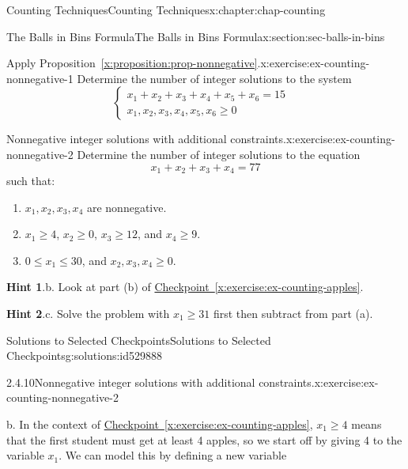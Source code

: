 \documentclass[oneside,10pt,]{book}
\newcommand{\blocktitlefont}{\relax}
\newcommand{\xreffont}{\relax}
\numberwithin{equation}{section}
\newcommand{\amp}{&}
\begin{document}
\begin{chapterptx}{Counting Techniques}{}{Counting Techniques}{}{}{x:chapter:chap-counting}
\begin{sectionptx}{The Balls in Bins Formula}{}{The Balls in Bins Formula}{}{}{x:section:sec-balls-in-bins}
\begin{inlineexercise}{Apply Proposition~{\xreffont\ref*{x:proposition:prop-nonnegative}}.}{x:exercise:ex-counting-nonnegative-1}%
Determine the number of integer solutions to the system%
\begin{equation*}
\begin{cases}
x_1 + x_2 + x_3 + x_4 + x_5 + x_6 = 15 \amp \\ x_1, x_2, x_3, x_4, x_5, x_6 \geq 0 \amp
\end{cases}
\end{equation*}
%
\end{inlineexercise}%
\begin{inlineexercise}{Nonnegative integer solutions with additional constraints.}{x:exercise:ex-counting-nonnegative-2}%
Determine the number of integer solutions to the equation%
\begin{equation*}
x_1 + x_2 + x_3 + x_4 = 77
\end{equation*}
such that:%
\begin{enumerate}[label=(\alph*)]
\item{}\(x_1, x_2, x_3, x_4\) are nonnegative.%
\item{}\(x_1 \geq 4\), \(x_2 \geq 0\), \(x_3 \geq 12\), and \(x_4 \geq 9\).%
\item{}\(0 \leq x_1 \leq 30\), and \(x_2, x_3, x_4 \geq 0\).%
\end{enumerate}
%
\par\smallskip%
\noindent\textbf{\blocktitlefont Hint 1}.\hypertarget{g:hint:id529799}{}\quad{}b. Look at part (b) of \hyperref[x:exercise:ex-counting-apples]{Checkpoint~{\xreffont\ref{x:exercise:ex-counting-apples}}}.%
\par\smallskip%
\noindent\textbf{\blocktitlefont Hint 2}.\hypertarget{g:hint:id529825}{}\quad{}c. Solve the problem with \(x_1 \geq 31\) first then subtract from part (a).%
\end{inlineexercise}%
%
%
\typeout{************************************************}
\typeout{************************************************}
%
\begin{solutions-subsection-numberless}{Solutions to Selected Checkpoints}{}{Solutions to Selected Checkpoints}{}{}{g:solutions:id529888}
\begin{inlinesolution}{2.4.10}{Nonnegative integer solutions with additional constraints.}{x:exercise:ex-counting-nonnegative-2}%
\par\smallskip%
\noindent\hypertarget{g:solution:id529817-main}{}b. In the context of \hyperref[x:exercise:ex-counting-apples]{Checkpoint~{\xreffont\ref{x:exercise:ex-counting-apples}}}, \(x_1 \geq 4\) means that the first student must get at least 4 apples, so we start off by giving 4 to the variable \(x_1\). We can model this by defining a new variable%

\end{inlinesolution}
\end{solutions-subsection-numberless}
\end{sectionptx}
\end{chapterptx}
\end{document}
